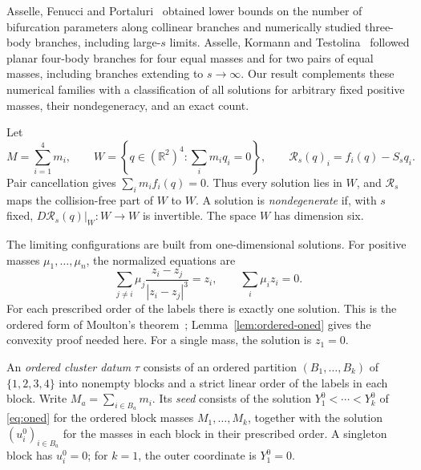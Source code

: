 \documentclass[11pt,a4paper]{amsart}
\numberwithin{equation}{section}
\newcommand{\R}{\mathbb R}
\newcommand{\cR}{\mathcal R}
\begin{document}
Asselle, Fenucci and Portaluri~\cite[Theorem~4.7 and Section~5.2]{AFP}
obtained lower bounds on the number of bifurcation parameters along
collinear branches and numerically studied three-body branches,
including large-$s$ limits. Asselle, Kormann and
Testolina~\cite[Section~7]{AKT} followed planar four-body branches for
four equal masses and for two pairs of equal masses, including branches
extending to $s\to\infty$. Our result complements these numerical
families with a classification of all solutions for arbitrary fixed
positive masses, their nondegeneracy, and an exact count.

Let
\begin{equation}\label{eq:center-space}
 M=\sum_{i=1}^4m_i,\qquad
 W=\left\{q\in(\R^2)^4:\sum_i m_iq_i=0\right\},\qquad
 \cR_s(q)_i=f_i(q)-S_s q_i.
\end{equation}
Pair cancellation gives $\sum_i m_if_i(q)=0$. Thus every solution lies
in $W$, and $\cR_s$ maps the collision-free part of $W$ to $W$.
A solution is \emph{nondegenerate} if, with $s$ fixed,
$D\cR_s(q)|_W:W\to W$ is invertible. The space $W$ has dimension six.

The limiting configurations are built from one-dimensional solutions.
For positive masses $\mu_1,\ldots,\mu_n$, the normalized equations are
\begin{equation}\label{eq:oned}
 \sum_{j\ne i}\mu_j\frac{z_i-z_j}{|z_i-z_j|^3}=z_i,
 \qquad \sum_i\mu_i z_i=0.
\end{equation}
For each prescribed order of the labels there is exactly one solution.
This is the ordered form of Moulton's theorem~\cite{Moulton};
Lemma~\ref{lem:ordered-oned} gives the convexity proof needed here.
For a single mass, the solution is $z_1=0$.

An \emph{ordered cluster datum} $\tau$ consists of an ordered partition
$(B_1,\ldots,B_k)$ of $\{1,2,3,4\}$ into nonempty blocks and a strict
linear order of the labels in each block. Write
$M_a=\sum_{i\in B_a}m_i$. Its \emph{seed} consists of the solution
$Y_1^0<\cdots<Y_k^0$ of \eqref{eq:oned} for the ordered block masses
$M_1,\ldots,M_k$, together with the solution $(u_i^0)_{i\in B_a}$
for the masses in each block in their prescribed order. A singleton
block has $u_i^0=0$; for $k=1$, the outer coordinate is $Y_1^0=0$.
\end{document}

